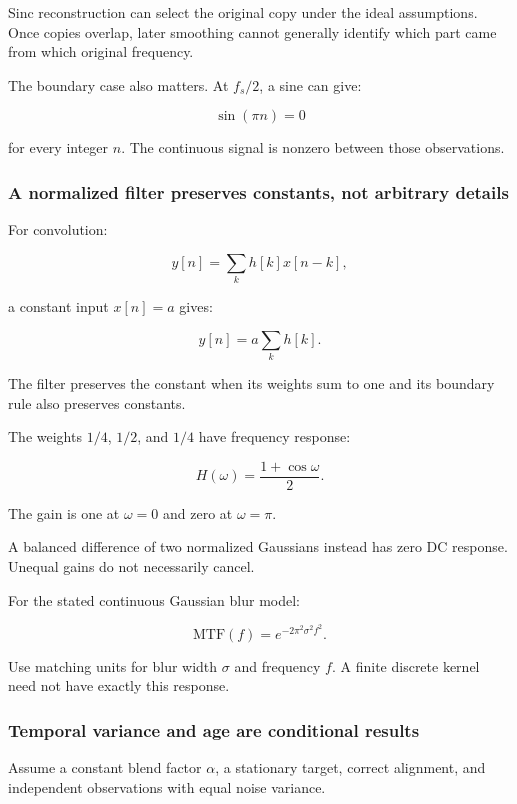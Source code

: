 Sinc reconstruction can select the original copy under the ideal assumptions. Once copies overlap, later smoothing cannot generally identify which part came from which original frequency.

The boundary case also matters. At \(f_s/2\), a sine can give:

\[
\sin(\pi n)=0
\]

for every integer \(n\). The continuous signal is nonzero between those observations.

\subsubsection{A normalized filter preserves constants, not arbitrary details}\label{04-visual-computing-ii-ch043-a-normalized-filter-preserves-constants-not-arbitrary-details}

For convolution:

\[
y[n]=\sum_k h[k]x[n-k],
\]

a constant input \(x[n]=a\) gives:

\[
y[n]=a\sum_k h[k].
\]

The filter preserves the constant when its weights sum to one and its boundary rule also preserves constants.

The weights \(1/4\), \(1/2\), and \(1/4\) have frequency response:

\[
H(\omega)=\frac{1+\cos\omega}{2}.
\]

The gain is one at \(\omega=0\) and zero at \(\omega=\pi\).

A balanced difference of two normalized Gaussians instead has zero DC response. Unequal gains do not necessarily cancel.

For the stated continuous Gaussian blur model:

\[
\mathrm{MTF}(f)=e^{-2\pi^2\sigma^2f^2}.
\]

Use matching units for blur width \(\sigma\) and frequency \(f\). A finite discrete kernel need not have exactly this response.

\subsubsection{Temporal variance and age are conditional results}\label{04-visual-computing-ii-ch043-temporal-variance-and-age-are-conditional-results}

Assume a constant blend factor \(\alpha\), a stationary target, correct alignment, and independent observations with equal noise variance.

